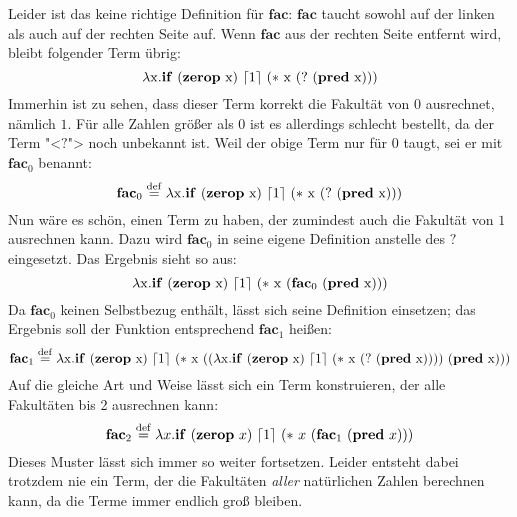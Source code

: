 Leider ist das keine richtige Definition für $\mathbf{fac}$:
$\mathbf{fac}$ taucht sowohl auf der linken
als auch auf der rechten Seite auf.  Wenn $\mathbf{fac}$ aus der
rechten Seite entfernt wird, bleibt folgender Term übrig:
%
\begin{displaymath}
  \lambda \mathrm x.\mathbf{if}~(\mathbf{zerop}~\mathrm x)~\lceil 1\rceil~(\ast~\mathrm x~(?~(\mathbf{pred}~\mathrm x)))
\end{displaymath}
%
Immerhin ist zu sehen, dass dieser Term korrekt die Fakultät von $0$
ausrechnet, nämlich $1$.  Für alle Zahlen größer als $0$ ist es allerdings
schlecht bestellt, da der Term "<$?$"> noch unbekannt ist.
Weil der obige Term nur für $0$ taugt, sei er mit $\mathbf{fac}_0$
benannt:
%
\begin{displaymath}
  \mathbf{fac}_0 \stackrel{\rm def}{=} \lambda \mathrm x.\mathbf{if}~(\mathbf{zerop}~\mathrm
  x)~\lceil 1\rceil~(\ast~\mathrm x~(?~(\mathbf{pred}~\mathrm x)))
\end{displaymath}
%
Nun wäre es schön, einen Term zu haben, der zumindest auch die
Fakultät von $1$ ausrechnen kann.  Dazu wird $\mathbf{fac}_0$ in
seine eigene Definition anstelle des $?$ eingesetzt.  Das Ergebnis
sieht so aus:
%
\begin{displaymath}
  \lambda \mathrm x.\mathbf{if}~(\mathbf{zerop}~\mathrm x)~\lceil 1\rceil~(\ast~\mathrm x~(\mathbf{fac}_0~(\mathbf{pred}~\mathrm x)))
\end{displaymath}
%
Da $\mathbf{fac}_0$ keinen Selbstbezug enthält, lässt sich seine
Definition einsetzen; das Ergebnis soll der Funktion entsprechend
$\mathbf{fac}_1$ heißen:
%
\begin{displaymath}
  \mathbf{fac}_1 \stackrel{\rm def}{=}{} \lambda \mathrm
  x.\mathbf{if}~(\mathbf{zerop}~\mathrm x)~\lceil 1\rceil~(\ast~\mathrm
  x~((\lambda \mathrm x.\mathbf{if}~(\mathbf{zerop}~\mathrm x)~\lceil 1\rceil~(\ast~\mathrm x~(?~(\mathbf{pred}~\mathrm x))))~(\mathbf{pred}~\mathrm x)))
\end{displaymath}
%
Auf die gleiche Art und Weise lässt sich ein Term konstruieren, der
alle Fakultäten bis 2 ausrechnen kann:
%
\begin{displaymath}
  \mathbf{fac}_2 \stackrel{\rm def}{=}{} \lambda
  x.\mathbf{if}~(\mathbf{zerop}~x)~\lceil 1\rceil~(\ast~x~(\mathbf{fac}_1~(\mathbf{pred}~x)))
\end{displaymath}
%
Dieses Muster lässt sich immer so weiter fortsetzen.  Leider entsteht
dabei trotzdem nie ein Term, der die Fakultäten \emph{aller}
natürlichen Zahlen berechnen kann, da die Terme immer endlich groß
bleiben.

